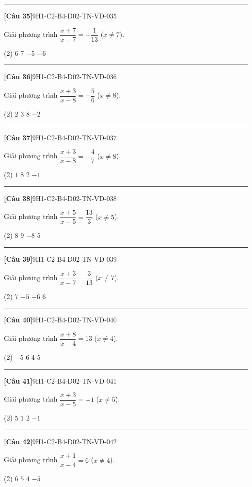 \documentclass[12pt,a4paper]{article}
\newif\ifloigiai
\newenvironment{cauhoi}[2]{%
  \par\medskip\noindent\rule{\textwidth}{0.4pt}\par\nopagebreak
  \noindent\textbf{[#1]}\hfill{\scriptsize\ttfamily #2}\par\nopagebreak\smallskip}{\par}
\newcommand{\dapan}[1]{\ifloigiai\par\smallskip\noindent\textit{Đáp án:} \textbf{#1}\par\fi}
\begin{document}
\begin{cauhoi}{Câu 35}{9H1-C2-B4-D02-TN-VD-035}
Giải phương trình $\dfrac{x+7}{x-7}=-\dfrac{1}{13}$ ($x\ne 7$).
\begin{tasks}(2)
\task $6$
\task $7$
\task $-5$
\task $-6$
\end{tasks}
\dapan{D}
\end{cauhoi}
\begin{cauhoi}{Câu 36}{9H1-C2-B4-D02-TN-VD-036}
Giải phương trình $\dfrac{x+3}{x-8}=-\dfrac{5}{6}$ ($x\ne 8$).
\begin{tasks}(2)
\task $2$
\task $3$
\task $8$
\task $-2$
\end{tasks}
\dapan{A}
\end{cauhoi}
\begin{cauhoi}{Câu 37}{9H1-C2-B4-D02-TN-VD-037}
Giải phương trình $\dfrac{x+3}{x-8}=-\dfrac{4}{7}$ ($x\ne 8$).
\begin{tasks}(2)
\task $1$
\task $8$
\task $2$
\task $-1$
\end{tasks}
\dapan{A}
\end{cauhoi}
\begin{cauhoi}{Câu 38}{9H1-C2-B4-D02-TN-VD-038}
Giải phương trình $\dfrac{x+5}{x-5}=\dfrac{13}{3}$ ($x\ne 5$).
\begin{tasks}(2)
\task $8$
\task $9$
\task $-8$
\task $5$
\end{tasks}
\dapan{A}
\end{cauhoi}
\begin{cauhoi}{Câu 39}{9H1-C2-B4-D02-TN-VD-039}
Giải phương trình $\dfrac{x+3}{x-7}=\dfrac{3}{13}$ ($x\ne 7$).
\begin{tasks}(2)
\task $7$
\task $-5$
\task $-6$
\task $6$
\end{tasks}
\dapan{C}
\end{cauhoi}
\begin{cauhoi}{Câu 40}{9H1-C2-B4-D02-TN-VD-040}
Giải phương trình $\dfrac{x+8}{x-4}=13$ ($x\ne 4$).
\begin{tasks}(2)
\task $-5$
\task $6$
\task $4$
\task $5$
\end{tasks}
\dapan{D}
\end{cauhoi}
\begin{cauhoi}{Câu 41}{9H1-C2-B4-D02-TN-VD-041}
Giải phương trình $\dfrac{x+3}{x-5}=-1$ ($x\ne 5$).
\begin{tasks}(2)
\task $5$
\task $1$
\task $2$
\task $-1$
\end{tasks}
\dapan{B}
\end{cauhoi}
\begin{cauhoi}{Câu 42}{9H1-C2-B4-D02-TN-VD-042}
Giải phương trình $\dfrac{x+1}{x-4}=6$ ($x\ne 4$).
\begin{tasks}(2)
\task $6$
\task $5$
\task $4$
\task $-5$
\end{tasks}
\dapan{B}
\end{cauhoi}
\end{document}
